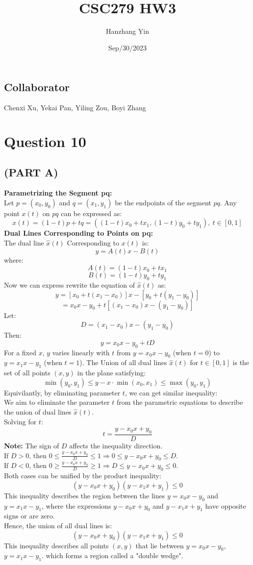 \documentclass{article}
\title{CSC279 HW3}
\author{Hanzhang Yin}
\date{Sep/30/2023}
\begin{document}
\maketitle

\subsection*{Collaborator}
Chenxi Xu, Yekai Pan, Yiling Zou, Boyi Zhang

\section*{Question 10}

\subsection*{(PART A)}
\textbf{Parametrizing the Segment pq: }
\\
Let $p = (x_0, y_0)$ and $q = (x_1, y_1)$ be the endpoints of the segment $pq$. Any point $x(t)$ on $pq$ can 
be expressed as: 
\[ x(t) = (1 - t)p + tq = ((1 - t)x_0 + tx_1, (1 - t)y_0 + ty_1), \ t \in [0, 1] \]
\textbf{Dual Lines Corresponding to Points on pq: }
\\
The dual line $\hat{x}(t)$ Corresponding to $x(t)$ is:
\[ y = A(t)x - B(t) \]
where:
\[ A(t) = (1 - t)x_0 + tx_1 \]
\[ B(t) = (1 - t)y_0 + ty_1 \]
Now we can express rewrite the equation of $\hat{x}(t)$ as:
\[ y = [x_0 + t(x_1 - x_0)]x - [y_0 + t(y_1 - y_0)] \]
\[ = x_0x - y_0 + t[(x_1 - x_0)x - (y_1 - y_0)] \]
Let:
\[ D = (x_1 - x_0)x - (y_1 - y_0) \]
Then:
\[ y = x_0x - y_0 + tD \]
For a fixed $x$, $y$ varies linearly with $t$ from $y = x_0x - y_0$ (when $t = 0$) to $y = x_1x - y_1$ (when $t = 1$).
The Union of all dual lines $\hat{x}(t)$ for $t \in [0,1]$ is the set of all points $(x, y)$ in the plane satisfying:
\[ \min(y_0, y_1) \leq y - x \cdot \min(x_0, x_1) \leq \max(y_0, y_1) \]
Equivilantly, by eliminating parameter $t$, we can get similar inequality:
\\
We aim to eliminate the parameter \( t \) from the parametric equations to describe the union of dual lines \(\hat{x}(t)\).
\\
Solving for \( t \):
\[
t = \frac{y - x_0 x + y_0}{D}
\]
\textbf{Note:} The sign of \( D \) affects the inequality direction.
\\
If \( D > 0 \), then \( 0 \leq \frac{y - x_0 x + y_0}{D} \leq 1 \Rightarrow 0 \leq y - x_0 x + y_0 \leq D \).
\\
If \( D < 0 \), then \( 0 \geq \frac{y - x_0 x + y_0}{D} \geq 1 \Rightarrow D \leq y - x_0 x + y_0 \leq 0 \).
\\
Both cases can be unified by the product inequality:
\[ (y - x_0 x + y_0)(y - x_1 x + y_1) \leq 0 \]
This inequality describes the region between the lines \( y = x_0 x - y_0 \) and \( y = x_1 x - y_1 \), where the expressions \( y - x_0 x + y_0 \) and \( y - x_1 x + y_1 \) have opposite signs or are zero.
\\
Hence, the union of all dual lines is:
\[ (y - x_0 x + y_0)(y - x_1 x + y_1) \leq 0 \]
This inequality describes all points $(x, y)$ that lie between $y = x_0x - y_0$, $y = x_1x - y_1$. 
which forms a region called a "double wedge".
\end{document}

